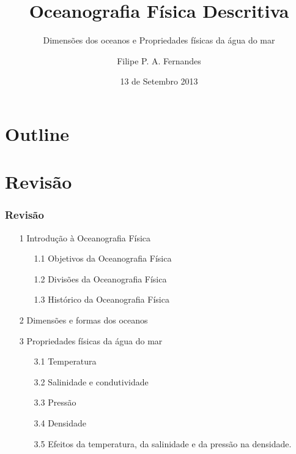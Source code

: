 \title[Aula 03]{Oceanografia Física Descritiva}
\subtitle{Dimensões dos oceanos e Propriedades físicas da água do mar}
\author[Filipe Fernandes]{Filipe P. A. Fernandes}
\date[Agosto 2013]{13 de Setembro 2013}




\begin{frame}[plain]
  \titlepage
\end{frame}

\section*{Outline}
\begin{frame}
\tableofcontents
\end{frame}

\section{Revisão}
\begin{frame}
\frametitle{Revisão}
    \footnotesize{
    \begin{itemize}[<+-| alert@+>]
    \item[1] Introdução à Oceanografia Física
    \begin{enumerate}[<+-| alert@+>]
        \item[1.1] Objetivos da Oceanografia Física
        \item[1.2] Divisões da Oceanografia Física
        \item[1.3] Histórico da Oceanografia Física
    \end{enumerate}
    \item[2] Dimensões e formas dos oceanos
    \item[3] Propriedades físicas da água do mar
    \begin{enumerate}[<+-| alert@+>]
        \item[3.1] Temperatura
        \item[3.2] Salinidade e condutividade
        \item[3.3] Pressão
        \item[3.4] Densidade
        \item[3.5] Efeitos da temperatura, da salinidade e da pressão na
                   densidade.
    \end{enumerate}
    \end{itemize}
    }
\end{frame}


